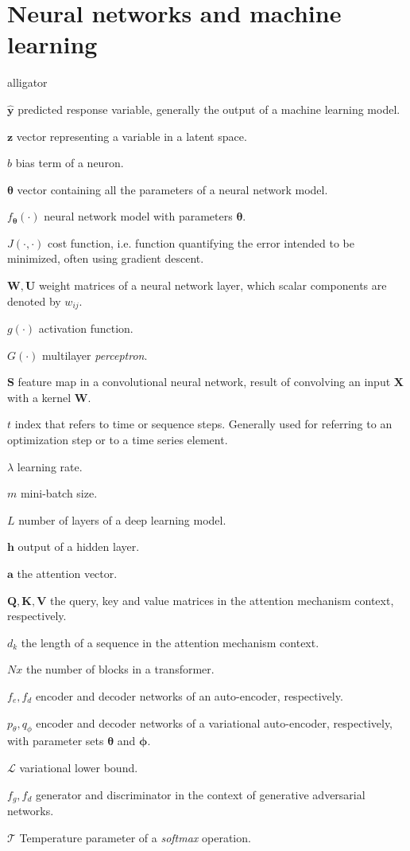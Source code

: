 \section*{Neural networks and machine learning}

\begin{labeling}{alligator}
	\item [$\mathbf{\hat{y}}$] predicted response variable, generally the output of a machine learning model.
	\item [$\mathbf{z}$] vector representing a variable in a latent space.
	\item [$b$] bias term of a neuron.
	\item [$\mathbf{\theta}$] vector containing all the parameters of a neural network model.
	\item [$f_\mathbf{\theta}(\cdot)$] neural network model with parameters $\mathbf{\theta}$.
	\item [$J(\cdot, \cdot)$] cost function, i.e. function quantifying the error intended to be minimized, often using gradient descent.
	\item [$\mathbf{W}, \mathbf{U}$] weight matrices of a neural network layer, which scalar components are denoted by $w_{ij}$.
	\item[$g(\cdot)$] activation function.
	\item[$G(\cdot)$] multilayer \textit{perceptron}.
	\item[$\mathbf{S}$] feature map in a convolutional neural network, result of convolving an input $\mathbf{X}$ with a kernel $\mathbf{W}$.
	\item[$t$] index that refers to time or sequence steps. Generally used for referring to  an optimization step or to a time series element.
	\item[$\lambda$] learning rate.
	\item[$m$] mini-batch size.
	\item[$L$] number of layers of a deep learning model.
	\item[$\mathbf{h}$] output of a hidden layer.
	\item[$\mathbf{a}$] the attention vector.
	\item[$\mathbf{Q}, \mathbf{K}, \mathbf{V}$] the query, key and value matrices in the attention mechanism context, respectively.
	\item[$d_k$]{the length of a sequence in the attention mechanism context.}
	\item[$Nx$]{the number of blocks in a transformer.}
	\item[$f_e, f_d$]{encoder and decoder networks of an auto-encoder, respectively.}
	\item[$p_\theta, q_\phi$]{encoder and decoder networks of a variational auto-encoder, respectively, with parameter sets $\mathbf{\theta}$ and $\mathbf{\phi}$.}
	\item[$\mathcal{L}$]{variational lower bound.}
	\item[$f_g, f_d$]{generator and discriminator in the context of generative adversarial networks.}
	\item[$\mathcal{T}$] Temperature parameter of a \textit{softmax} operation.
\end{labeling}

